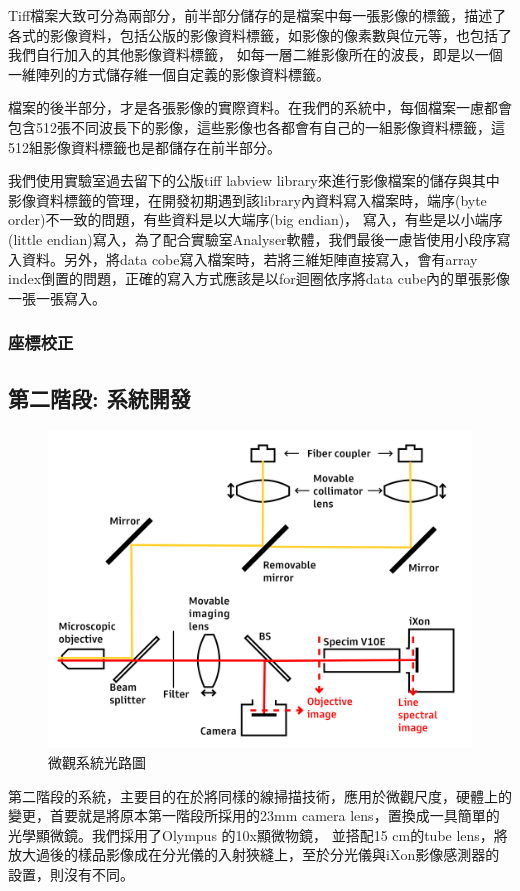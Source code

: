 \documentclass[12pt]{article}
\begin{document}
Tiff檔案大致可分為兩部分，前半部分儲存的是檔案中每一張影像的標籤，描述了各式的影像資料，包括公版的影像資料標籤，如影像的像素數與位元等，也包括了我們自行加入的其他影像資料標籤，
如每一層二維影像所在的波長，即是以一個一維陣列的方式儲存維一個自定義的影像資料標籤。

檔案的後半部分，才是各張影像的實際資料。在我們的系統中，每個檔案一慮都會包含512張不同波長下的影像，這些影像也各都會有自己的一組影像資料標籤，這512組影像資料標籤也是都儲存在前半部分。

我們使用實驗室過去留下的公版tiff labview library來進行影像檔案的儲存與其中影像資料標籤的管理，在開發初期遇到該library內資料寫入檔案時，端序(byte order)不一致的問題，有些資料是以大端序(big endian)，
寫入，有些是以小端序(little endian)寫入，為了配合實驗室Analyser軟體，我們最後一慮皆使用小段序寫入資料。另外，將data cobe寫入檔案時，若將三維矩陣直接寫入，會有array index倒置的問題，正確的寫入方式應該是以for迴圈依序將data cube內的單張影像一張一張寫入。


\subsubsection{座標校正}

\subsection{第二階段: 系統開發}
\begin{figure}
    \centering
    \includegraphics[width = 0.75\linewidth]{lightPath2.jpg}
    \caption{微觀系統光路圖}
\end{figure}
第二階段的系統，主要目的在於將同樣的線掃描技術，應用於微觀尺度，硬體上的變更，首要就是將原本第一階段所採用的23mm camera lens，置換成一具簡單的光學顯微鏡。我們採用了Olympus 的10x顯微物鏡，
並搭配15 cm的tube lens，將放大過後的樣品影像成在分光儀的入射狹縫上，至於分光儀與iXon影像感測器的設置，則沒有不同。
\end{document}
